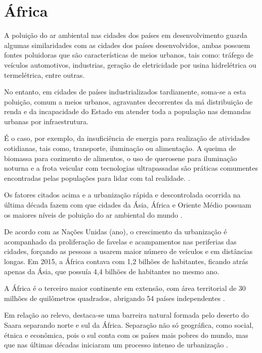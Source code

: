 \section{África}

A poluição do ar ambiental nas cidades dos países em desenvolvimento
guarda algumas similaridades com as cidades dos países desenvolvidos,
ambas possuem fontes poluidoras que são características de meios urbanos, 
tais como: tráfego de veículos automotivos, industrias, geração de 
eletricidade por usina hidrelétrica ou termelétrica, entre outras. 

No entanto, em cidades de países industrializados tardiamente, soma-se a esta 
poluição, comum a meios urbanos, agravantes decorrentes da má distribuição de renda e 
da incapacidade do Estado em atender toda a população nas demandas urbanas 
por infraestrutura.

É o caso, por exemplo, da insuficiência de energia para realização de atividades cotidianas, 
tais como, transporte, iluminação ou alimentação. 
A queima de biomassa para cozimento de alimentos, o uso de querosene para 
iluminação noturna e a frota veicular com tecnologias ultrapassadas são práticas
comumentes encontradas pelas populações para lidar com tal realidade.
\citep{brauer2012}.

Os fatores citados acima e a urbanização rápida e descontrolada ocorrida na
última década fazem com que cidades da Ásia, África e Oriente 
Médio possuam os maiores níveis de poluição do ar ambiental do mundo 
\citep{brauer2012}.

De acordo com as Nações Unidas (ano), o crescimento da urbanização é acompanhado 
da proliferação de favelas e acampamentos nas periferias das cidades, forçando
as pessoas a usarem maior número de veículos e em distâncias longas.  
Em 2015, a África contava com 1,2 bilhões de habitantes, ficando atrás 
apenas da Ásia, que possuía 4,4 bilhões de habitantes no mesmo ano.
 
A África é o terceiro maior continente em extensão, com área territorial 
de 30 milhões de quilômetros quadrados, abrigando 54 países independentes 
\citep{UN}.

Em relação ao relevo, destaca-se uma barreira natural formada pelo deserto do 
Saara separando norte e sul da África. Separação não só geográfica, como
social, étnica e econômica, pois o sul conta com os países mais pobres do mundo, 
mas que nas últimas décadas iniciaram um processo intenso de urbanização 
\citep{UN}.



